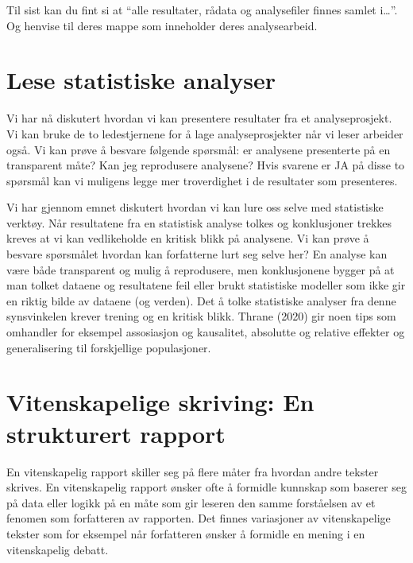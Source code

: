 \documentclass[
  letterpaper,
  DIV=11,
  numbers=noendperiod,
  oneside]{scrreprt}
\begin{document}
Til sist kan du fint si at ``alle resultater, rådata og analysefiler
finnes samlet i\ldots{}''. Og henvise til deres mappe som inneholder
deres analysearbeid.

\hypertarget{lese-statistiske-analyser}{%
\section{Lese statistiske analyser}\label{lese-statistiske-analyser}}

Vi har nå diskutert hvordan vi kan presentere resultater fra et
analyseprosjekt. Vi kan bruke de to ledestjernene for å lage
analyseprosjekter når vi leser arbeider også. Vi kan prøve å besvare
følgende spørsmål: er analysene presenterte på en transparent måte? Kan
jeg reprodusere analysene? Hvis svarene er JA på disse to spørsmål kan
vi muligens legge mer troverdighet i de resultater som presenteres.

Vi har gjennom emnet diskutert hvordan vi kan lure oss selve med
statistiske verktøy. Når resultatene fra en statistisk analyse tolkes og
konklusjoner trekkes kreves at vi kan vedlikeholde en kritisk blikk på
analysene. Vi kan prøve å besvare spørsmålet hvordan kan forfatterne
lurt seg selve her? En analyse kan være både transparent og mulig å
reprodusere, men konklusjonene bygger på at man tolket dataene og
resultatene feil eller brukt statistiske modeller som ikke gir en riktig
bilde av dataene (og verden). Det å tolke statistiske analyser fra denne
synsvinkelen krever trening og en kritisk blikk. Thrane
(2020)
gir noen tips som omhandler for eksempel assosiasjon og kausalitet,
absolutte og relative effekter og generalisering til forskjellige
populasjoner.

\hypertarget{vitenskapelige-skriving-en-strukturert-rapport}{%
\section{Vitenskapelige skriving: En strukturert
rapport}\label{vitenskapelige-skriving-en-strukturert-rapport}}

En vitenskapelig rapport skiller seg på flere måter fra hvordan andre
tekster skrives. En vitenskapelig rapport ønsker ofte å formidle
kunnskap som baserer seg på data eller logikk på en måte som gir leseren
den samme forståelsen av et fenomen som forfatteren av rapporten. Det
finnes variasjoner av vitenskapelige tekster som for eksempel når
forfatteren ønsker å formidle en mening i en vitenskapelig debatt.
\end{document}
